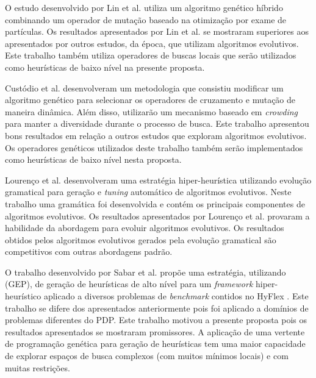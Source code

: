 O estudo desenvolvido por Lin et al. \cite{lin2011protein} utiliza um algoritmo genético híbrido combinando um operador de mutação baseado na otimização por exame de partículas. Os resultados apresentados por Lin et al. se mostraram superiores aos apresentados por outros estudos, da época, que utilizam algoritmos evolutivos. Este trabalho também utiliza operadores de buscas locais que serão utilizados como heurísticas de baixo nível na presente proposta. 


Custódio et al. \cite{custodio2014multiple} desenvolveram um metodologia que consistiu modificar um algoritmo genético para selecionar os operadores de cruzamento e mutação de maneira dinâmica. Além disso, utilizarão um mecanismo baseado em \textit{crowding}  para manter a diversidade durante o processo de busca. Este trabalho apresentou bons resultados em relação a outros estudos que exploram algoritmos evolutivos. Os operadores genéticos utilizados deste trabalho também serão implementados como heurísticas de baixo nível nesta proposta. 


Lourenço et al. \cite{lourencco2012evolving} desenvolveram uma estratégia hiper-heurística utilizando evolução gramatical para geração e \textit{tuning} automático de algoritmos evolutivos. Neste trabalho uma gramática foi desenvolvida e contém os principais componentes de algoritmos evolutivos. Os resultados apresentados por Lourenço et al. provaram a habilidade da abordagem para evoluir algoritmos evolutivos. Os resultados obtidos pelos algoritmos evolutivos gerados pela evolução gramatical são competitivos com outras abordagens padrão.


O trabalho desenvolvido por Sabar et al. \cite{sabar2014automatic} propõe uma estratégia, utilizando  (GEP), de geração de heurísticas de alto nível para um \textit {framework} hiper-heurístico aplicado a diversos problemas de \textit{benchmark} contidos no  HyFlex \cite{ochoa2012hyflex}. Este trabalho se difere dos apresentados anteriormente pois foi aplicado a domínios de problemas diferentes do PDP. Este trabalho motivou a presente proposta pois os resultados apresentados se mostraram promissores. A aplicação de uma vertente de programação genética para geração de heurísticas tem uma maior capacidade de explorar espaços de busca complexos (com muitos mínimos locais) e com muitas restrições.


